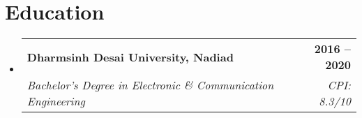 \documentclass[letterpaper,11pt]{article}
\makeatletter
\newcommand{\resumeSubheading}[4]{
  \vspace{-2pt}\item
    \begin{tabular*}{1.0\textwidth}[t]{l@{\extracolsep{\fill}}r}
      \textbf{#1} & \textbf{\small #2} \\
      \textit{\small#3} & \textit{\small #4} \\
    \end{tabular*}\vspace{-7pt}
}
\newcommand{\resumeSubHeadingListStart}{\begin{itemize}[leftmargin=0.0in, label={}]}
\newcommand{\resumeSubHeadingListEnd}{\end{itemize}}
\makeatother
\begin{document}
\section{Education}
  \resumeSubHeadingListStart

    \resumeSubheading
      {Dharmsinh Desai University, Nadiad}{2016 -- 2020}
      {Bachelor's Degree in Electronic \& Communication Engineering }{CPI: 8.3/10}
  
    \resumeSubHeadingListEnd
\vspace{-5pt}
\end{document}

